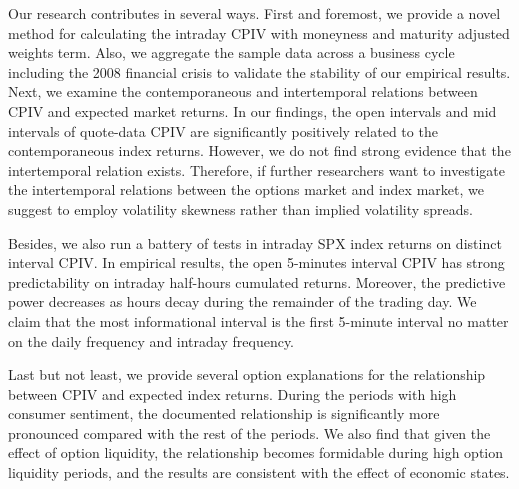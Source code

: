 Our research contributes in several ways. First and foremost, we provide a novel method for calculating the intraday CPIV with moneyness and maturity adjusted weights term. Also, we aggregate the sample data across a business cycle including the 2008 financial crisis to validate the stability of our empirical results. Next, we examine the contemporaneous and intertemporal relations between CPIV and expected market returns. In our findings, the open intervals and mid intervals of quote-data CPIV are significantly positively related to the contemporaneous index returns. However, we do not find strong evidence that the intertemporal relation exists. Therefore, if further researchers want to investigate the intertemporal relations between the options market and index market, we suggest to employ volatility skewness rather than implied volatility spreads.   

Besides, we also run a battery of tests in intraday SPX index returns on distinct interval CPIV. In empirical results, the open 5-minutes interval CPIV has strong predictability on intraday half-hours cumulated returns. Moreover, the predictive power decreases as hours decay during the remainder of the trading day. We claim that the most informational interval is the first 5-minute interval no matter on the daily frequency and intraday frequency. 

Last but not least, we provide several option explanations for the relationship between CPIV and expected index returns. During the periods with high consumer sentiment, the documented relationship is significantly more pronounced compared with the rest of the periods. We also find that given the effect of option liquidity, the relationship becomes formidable during high option liquidity periods, and the results are consistent with the effect of economic states.  
